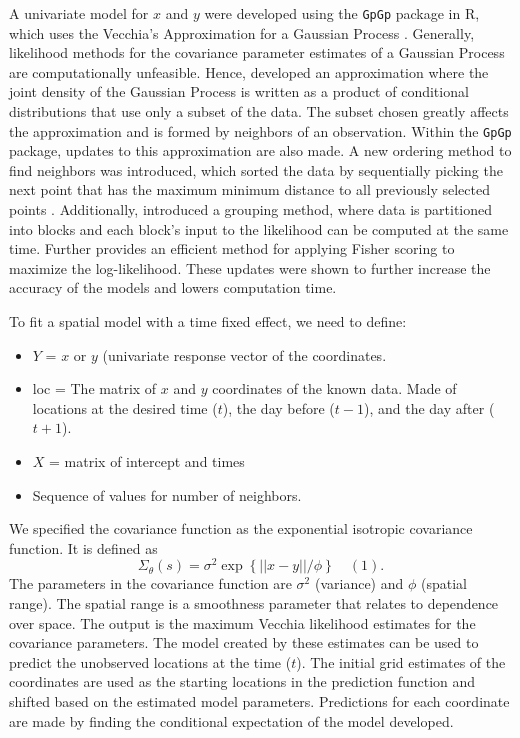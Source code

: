 \documentclass[12pt]{article}
\providecommand{\tightlist}{%
  \setlength{\itemsep}{0pt}\setlength{\parskip}{0pt}}
\begin{document}
A univariate model for \(x\) and \(y\) were developed using the
\texttt{GpGp} package in R, which uses the Vecchia's Approximation for a
Gaussian Process \citep{gpgp_pkg}. Generally, likelihood methods for the
covariance parameter estimates of a Gaussian Process are computationally
unfeasible. Hence, \citet{vecchia1988estimation} developed an
approximation where the joint density of the Gaussian Process is written
as a product of conditional distributions that use only a subset of the
data. The subset chosen greatly affects the approximation and is formed
by neighbors of an observation. Within the \texttt{GpGp} package,
updates to this approximation are also made. A new ordering method to
find neighbors was introduced, which sorted the data by sequentially
picking the next point that has the maximum minimum distance to all
previously selected points \citep{guinness_permutation_2018}.
Additionally, \citet{guinness_permutation_2018} introduced a grouping
method, where data is partitioned into blocks and each block's input to
the likelihood can be computed at the same time. Further
\citet{guinness_gaussian_2019} provides an efficient method for applying
Fisher scoring to maximize the log-likelihood. These updates were shown
to further increase the accuracy of the models and lowers computation
time.

To fit a spatial model with a time fixed effect, we need to define:

\begin{itemize}
\tightlist
\item
  \(Y\) = \(x\) or \(y\) (univariate response vector of the coordinates.
\item
  loc = The matrix of \(x\) and \(y\) coordinates of the known data.
  Made of locations at the desired time (\(t\)), the day before
  (\(t-1\)), and the day after (\(t+1\)).
\item
  \(X\) = matrix of intercept and times
\item
  Sequence of values for number of neighbors.
\end{itemize}

We specified the covariance function as the exponential isotropic
covariance function. It is defined as
\[\Sigma_{\theta}(s) = \sigma^2\exp\left\{||x-y||/\phi\right\} \quad (1).\]
The parameters in the covariance function are \(\sigma^2\) (variance)
and \(\phi\) (spatial range). The spatial range is a smoothness
parameter that relates to dependence over space. The output is the
maximum Vecchia likelihood estimates for the covariance parameters. The
model created by these estimates can be used to predict the unobserved
locations at the time (\(t\)). The initial grid estimates of the
coordinates are used as the starting locations in the prediction
function and shifted based on the estimated model parameters.
Predictions for each coordinate are made by finding the conditional
expectation of the model developed.
\end{document}
